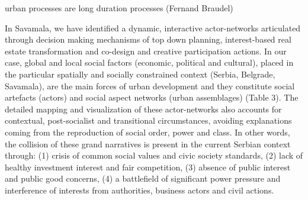 \documentclass[11pt]{report}
\begin{document}
urban processes are long duration processes (Fernand Braudel)

In Savamala, we have identified a dynamic, interactive actor-networks articulated through decision making mechanisms of top down planning, interest-based real estate transformation and co-design and creative participation actions. In our case, global and local social factors (economic, political and cultural), placed in the particular spatially and socially constrained context (Serbia, Belgrade, Savamala), are the main forces of urban development and they constitute social artefacts (actors) and social aspect networks (urban assemblages) (Table 3). The detailed mapping and visualization of these actor-networks also accounts for contextual, post-socialist and transitional circumstances, avoiding explanations coming from the reproduction of social order, power and class. In other words, the collision of these grand narratives is present in the current Serbian context through: (1) crisis of common social values and civic society standards, (2) lack of healthy investment interest and fair competition, (3) absence of public interest and public good concerns, (4) a battlefield of significant power pressure and interference of interests from authorities, business actors and civil actions.
\end{document}
